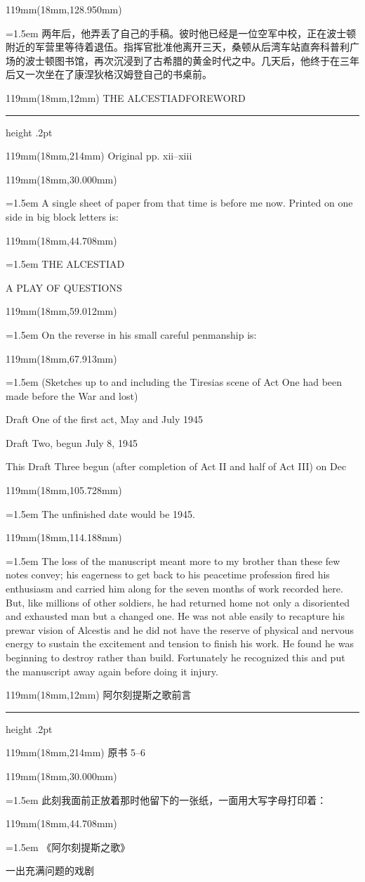 \documentclass{article}
\newcommand{\ENsetup}{\normalfont\color{ink}\fontsize{11}{16.5}\selectfont\emergencystretch=1.5em}
\newcommand{\ZHsetup}{\normalfont\color{ink}\fontsize{10.5}{17}\selectfont\emergencystretch=1.5em}
\newcommand{\Block}[3]{\begin{textblock*}{119mm}(18mm,#1mm){#2 #3\par}\end{textblock*}}
\newcommand{\Heading}[3]{%
  \begin{textblock*}{119mm}(18mm,12mm)
    \color{quiet}\fontsize{7.5}{10}\selectfont
    #1\hfill #2\par\vspace{3mm}\hrule height .2pt
  \end{textblock*}
  \begin{textblock*}{119mm}(18mm,214mm)
    \color{quiet}\fontsize{7}{10}\selectfont #3\hfill\thepage
  \end{textblock*}
}
\begin{document}
\Block{128.950}{\ZHsetup}{两年后，他弄丢了自己的手稿。彼时他已经是一位空军中校，正在波士顿附近的军营里等待着退伍。指挥官批准他离开三天，桑顿从后湾车站直奔科普利广场的波士顿图书馆，再次沉浸到了古希腊的黄金时代之中。几天后，他终于在三年后又一次坐在了康涅狄格汉姆登自己的书桌前。\par }
\newpage
\null
\Heading{THE ALCESTIAD}{FOREWORD}{Original pp. xii–xiii}
\Block{30.000}{\ENsetup}{A single sheet of paper from that time is before me now. Printed on one side in big block letters is:\par}
\Block{44.708}{\ENsetup}{\centering 
THE ALCESTIAD\par
A PLAY OF QUESTIONS\par}
\Block{59.012}{\ENsetup}{On the reverse in his small careful penmanship is:\par}
\Block{67.913}{\ENsetup}{\leftskip=4mm\rightskip=3mm 
(Sketches up to and including the Tiresias scene of Act One had been made before the War and lost)\par
Draft One of the first act, May and July 1945\par
Draft Two, begun July 8, 1945\par
This Draft Three begun (after completion of Act II and half of Act III) on Dec\par}
\Block{105.728}{\ENsetup}{The unfinished date would be 1945.\par}
\Block{114.188}{\ENsetup}{The loss of the manuscript meant more to my brother than these few notes convey; his eagerness to get back to his peacetime profession fired his enthusiasm and carried him along for the seven months of work recorded here. But, like millions of other soldiers, he had returned home not only a disoriented and exhausted man but a changed one. He was not able easily to recapture his prewar vision of Alcestis and he did not have the reserve of physical and nervous energy to sustain the excitement and tension to finish his work. He found he was beginning to destroy rather than build. Fortunately he recognized this and put the manuscript away again before doing it injury.\par}
\newpage
\null
\Heading{阿尔刻提斯之歌}{前言}{原书 5–6}
\Block{30.000}{\ZHsetup}{此刻我面前正放着那时他留下的一张纸，一面用大写字母打印着：\par }
\Block{44.708}{\ZHsetup}{\centering\kai 《阿尔刻提斯之歌》\par 一出充满问题的戏剧\par }
\end{document}
